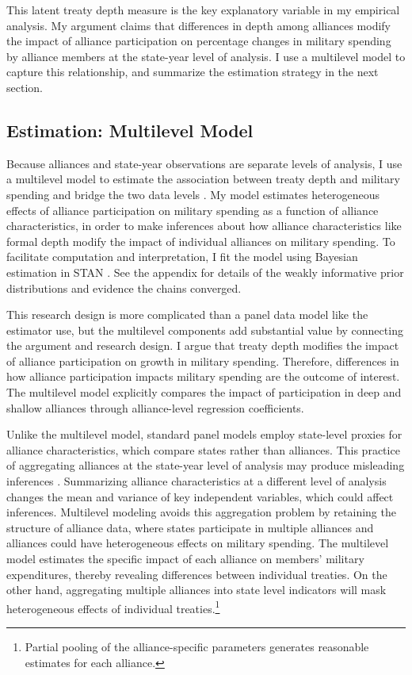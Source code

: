 \documentclass[12pt]{article}
\begin{document}
This latent treaty depth measure is the key explanatory variable in my empirical analysis. 
My argument claims that differences in depth among alliances modify the impact of alliance participation on percentage changes in military spending by alliance members at the state-year level of analysis. 
I use a multilevel model to capture this relationship, and summarize the estimation strategy in the next section. 


\subsection{Estimation: Multilevel Model} 


Because alliances and state-year observations are separate levels of analysis, I use a multilevel model to estimate the association between treaty depth and military spending and bridge the two data levels \citep{SteenbergenJones2002}. 
My model estimates heterogeneous effects of alliance participation on military spending as a function of alliance characteristics, in order to make inferences about how alliance characteristics like formal depth modify the impact of individual alliances on military spending.
To facilitate computation and interpretation, I fit the model using Bayesian estimation in STAN \citep{Carpenteretal2016}. 
See the appendix for details of the weakly informative prior distributions and evidence the chains converged.


This research design is more complicated than a panel data model like the estimator \citet{DigiuseppePoast2016} use, but the multilevel components add substantial value by connecting the argument and research design.
I argue that treaty depth modifies the impact of alliance participation on growth in military spending. 
Therefore, differences in how alliance participation impacts military spending are the outcome of interest.  
The multilevel model explicitly compares the impact of participation in deep and shallow alliances through alliance-level regression coefficients. 


Unlike the multilevel model, standard panel models employ state-level proxies for alliance characteristics, which compare states rather than alliances.
This practice of aggregating alliances at the state-year level of analysis may produce misleading inferences \citep[pg. 356]{McElreath2016}.
Summarizing alliance characteristics at a different level of analysis changes the mean and variance of key independent variables, which could affect inferences. 
Multilevel modeling avoids this aggregation problem by retaining the structure of alliance data, where states participate in multiple alliances and alliances could have heterogeneous effects on military spending.
The multilevel model estimates the specific impact of each alliance on members' military expenditures, thereby revealing differences between individual treaties. 
On the other hand, aggregating multiple alliances into state level indicators will mask heterogeneous effects of individual treaties.\footnote{Partial pooling of the alliance-specific parameters generates reasonable estimates for each alliance.} 
\end{document}
